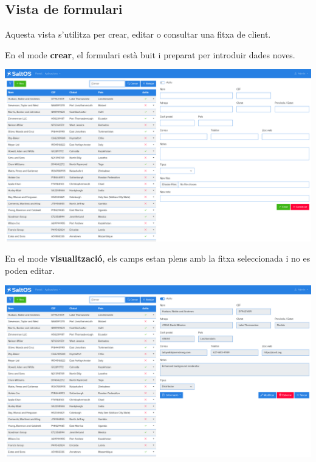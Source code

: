 \documentclass[a4paper]{article}
\begin{document}
\hypertarget{toc49}{}
\subsection{Vista de formulari}

Aquesta vista s'utilitza per crear, editar o consultar una fitxa de client.

En el mode \textbf{crear}, el formulari està buit i preparat per introduir dades noves.

\begin{center}\includegraphics[width=1\textwidth]{../ujest/snaps/test-screenshots-js-screenshots-crm-customers-create-ca-es-1-snap.png}\end{center}

En el mode \textbf{visualització}, els camps estan plens amb la fitxa seleccionada i no es poden editar.

\begin{center}\includegraphics[width=1\textwidth]{../ujest/snaps/test-screenshots-js-screenshots-crm-customers-view-100-ca-es-1-snap.png}\end{center}
\end{document}
